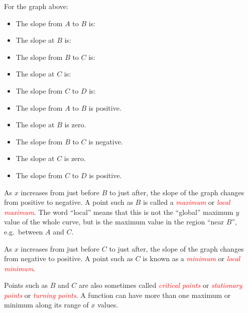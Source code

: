 \documentclass[
  11pt,
  oneside]{book}
\providecommand{\tightlist}{%
  \setlength{\itemsep}{0pt}\setlength{\parskip}{0pt}}
\newcommand{\slide}{}
\theoremstyle{definition}
\theoremstyle{definition}
\theoremstyle{definition}
\theoremstyle{definition}
\theoremstyle{remark}
\begin{document}
\slide

For the graph above:

\begin{slidesonly}

\begin{itemize}
\tightlist
\item
  The slope from \(A\) to \(B\) is:
\item
  The slope at \(B\) is:
\item
  The slope from \(B\) to \(C\) is:
\item
  The slope at \(C\) is:
\item
  The slope from \(C\) to \(D\) is:
\end{itemize}

\end{slidesonly}

\begin{notslides}

\begin{itemize}
\tightlist
\item
  The slope from \(A\) to \(B\) is positive.
\item
  The slope at \(B\) is zero.
\item
  The slope from \(B\) to \(C\) is negative.
\item
  The slope at \(C\) is zero.
\item
  The slope from \(C\) to \(D\) is positive.
\end{itemize}

\end{notslides}

As \(x\) increases from just before \(B\) to just after, the slope of the graph changes from positive to negative. A point such as \(B\) is called a \textcolor{red}{\em maximum} or \textcolor{red}{\em local maximum}. The word ``local'' means that this is not the ``global'' maximum \(y\) value of the whole curve, but is the maximum value in the region ``near \(B\)'', e.g.~between \(A\) and \(C\).

As \(x\) increases from just before \(C\) to just after, the slope of the graph changes from negative to positive. A point such as \(C\) is known as a \textcolor{red}{\em minimum} or \textcolor{red}{\em local minimum}.

Points such as \(B\) and \(C\) are also sometimes called \textcolor{red}{\em critical points} or \textcolor{red}{\em stationary points} or \textcolor{red}{\em turning points}. A function can have more than one maximum or minimum along its range of \(x\) values.
\slide
\end{document}
